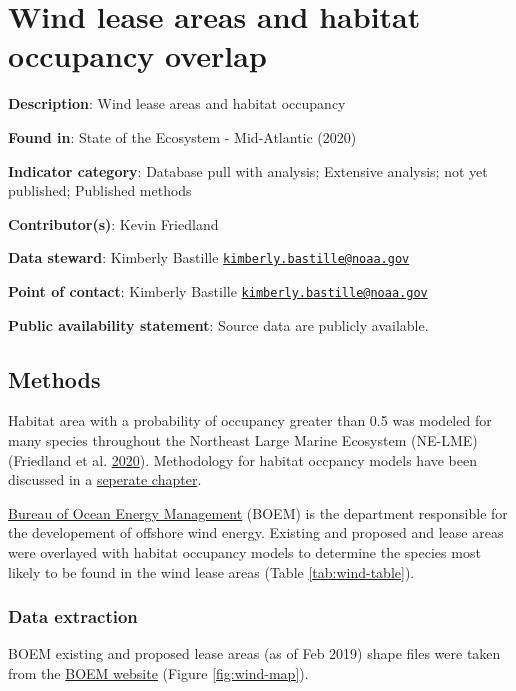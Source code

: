 \documentclass[
]{book}
\begin{document}
\hypertarget{wind-lease-areas-and-habitat-occupancy-overlap}{%
\chapter{Wind lease areas and habitat occupancy overlap}\label{wind-lease-areas-and-habitat-occupancy-overlap}}

\textbf{Description}: Wind lease areas and habitat occupancy

\textbf{Found in}: State of the Ecosystem - Mid-Atlantic (2020)

\textbf{Indicator category}: Database pull with analysis; Extensive analysis; not yet published; Published methods

\textbf{Contributor(s)}: Kevin Friedland

\textbf{Data steward}: Kimberly Bastille \href{mailto:kimberly.bastille@noaa.gov}{\nolinkurl{kimberly.bastille@noaa.gov}}

\textbf{Point of contact}: Kimberly Bastille \href{mailto:kimberly.bastille@noaa.gov}{\nolinkurl{kimberly.bastille@noaa.gov}}

\textbf{Public availability statement}: Source data are publicly available.

\hypertarget{methods-45}{%
\section{Methods}\label{methods-45}}

Habitat area with a probability of occupancy greater than 0.5 was modeled for many species throughout the Northeast Large Marine Ecosystem (NE-LME) (Friedland et al. \protect\hyperlink{ref-friedland2020}{2020}). Methodology for habitat occpancy models have been discussed in a \protect\hyperlink{hab-occu}{seperate chapter}.

\href{https://www.boem.gov/}{Bureau of Ocean Energy Management} (BOEM) is the department responsible for the developement of offshore wind energy. Existing and proposed and lease areas were overlayed with habitat occupancy models to determine the species most likely to be found in the wind lease areas (Table \ref{tab:wind-table}).

\hypertarget{data-extraction-35}{%
\subsection{Data extraction}\label{data-extraction-35}}

BOEM existing and proposed lease areas (as of Feb 2019) shape files were taken from the \href{https://www.boem.gov/renewable-energy/mapping-and-data/renewable-energy-gis-data}{BOEM website} (Figure \ref{fig:wind-map}).
\end{document}
